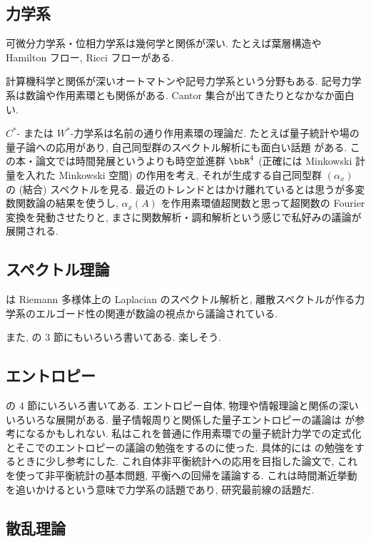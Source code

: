 \documentclass[openany, a4paper, oneside]{jsbook}
\begin{document}
\subsection{力学系}

可微分力学系・位相力学系は幾何学と関係が深い.
たとえば葉層構造や Hamilton フロー, Ricci フローがある.

計算機科学と関係が深いオートマトンや記号力学系という分野もある.
記号力学系は数論や作用素環とも関係がある.
Cantor 集合が出てきたりとなかなか面白い.

$C^*$- または $W^*$-力学系は名前の通り作用素環の理論だ.
たとえば量子統計や場の量子論への応用があり, 自己同型群のスペクトル解析にも面白い話題 \cite{HansJurgenBorchers1, HansJurgenBorchers2, WojciechDybalski1} がある.
この本・論文では時間発展というよりも時空並進群 $\bbR^4$
(正確には Minkowski 計量を入れた Minkowski 空間) の作用を考え,
それが生成する自己同型群 $(\alpha_x)$ の (結合) スペクトルを見る.
最近のトレンドとはかけ離れているとは思うが多変数関数論の結果を使うし,
$\alpha_x (A)$ を作用素環値超関数と思って超関数の Fourier 変換を発動させたりと,
まさに関数解析・調和解析という感じで私好みの議論が展開される.
\subsection{スペクトル理論}

\cite{ShinyaKoyama1} は Riemann 多様体上の Laplacian のスペクトル解析と,
離散スペクトルが作る力学系のエルゴード性の関連が数論の視点から議論されている.

また, \cite{OmriSarig1} の 3 節にもいろいろ書いてある.
楽しそう.
\subsection{エントロピー}

\cite{OmriSarig1} の 4 節にいろいろ書いてある.
エントロピー自体, 物理や情報理論と関係の深いいろいろな展開がある.
量子情報周りと関係した量子エントロピーの議論は \cite{OhyaPetz1} が参考になるかもしれない.
私はこれを普通に作用素環での量子統計力学での定式化とそこでのエントロピーの議論の勉強をするのに使った.
具体的には \cite{DerezinskiJaksicPillet1} の勉強をするときに少し参考にした.
これ自体非平衡統計への応用を目指した論文で, これを使って非平衡統計の基本問題, 平衡への回帰を議論する.
これは時間漸近挙動を追いかけるという意味で力学系の話題であり, 研究最前線の話題だ.
\subsection{散乱理論}
\end{document}
